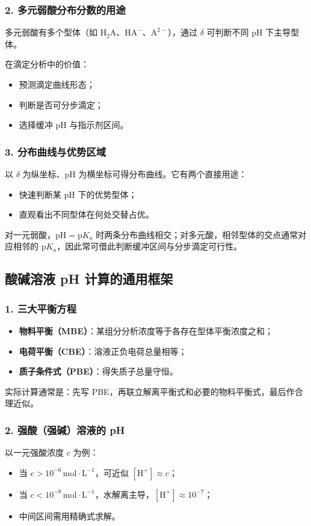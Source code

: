 \documentclass[12pt,a4paper]{article}
\numberwithin{equation}{section}
\begin{document}
\subsubsection{2. 多元弱酸分布分数的用途}
多元弱酸有多个型体（如 $\mathrm{H_2A}$、$\mathrm{HA^-}$、$\mathrm{A^{2-}}$），通过 $\delta$ 可判断不同 pH 下主导型体。

在滴定分析中的价值：
\begin{itemize}
    \item 预测滴定曲线形态；
    \item 判断是否可分步滴定；
    \item 选择缓冲 pH 与指示剂区间。
\end{itemize}

\subsubsection{3. 分布曲线与优势区域}
以 $\delta$ 为纵坐标、pH 为横坐标可得分布曲线。它有两个直接用途：
\begin{itemize}
    \item 快速判断某 pH 下的优势型体；
    \item 直观看出不同型体在何处交替占优。
\end{itemize}

对一元弱酸，$\mathrm{pH}=\mathrm{p}K_a$ 时两条分布曲线相交；对多元酸，相邻型体的交点通常对应相邻的
$\mathrm{p}K_a$，因此常可借此判断缓冲区间与分步滴定可行性。

\subsection{酸碱溶液 pH 计算的通用框架}

\subsubsection{1. 三大平衡方程}
\begin{itemize}
    \item \textbf{物料平衡（MBE）}：某组分分析浓度等于各存在型体平衡浓度之和；
    \item \textbf{电荷平衡（CBE）}：溶液正负电荷总量相等；
    \item \textbf{质子条件式（PBE）}：得失质子总量守恒。
\end{itemize}

实际计算通常是：先写 PBE，再联立解离平衡式和必要的物料平衡式，最后作合理近似。

\subsubsection{2. 强酸（强碱）溶液的 pH}
以一元强酸浓度 $c$ 为例：
\begin{itemize}
    \item 当 $c>10^{-6}\,\mathrm{mol\cdot L^{-1}}$，可近似 $[\mathrm{H^+}]\approx c$；
    \item 当 $c<10^{-8}\,\mathrm{mol\cdot L^{-1}}$，水解离主导，$[\mathrm{H^+}]\approx 10^{-7}$；
    \item 中间区间需用精确式求解。
\end{itemize}
\end{document}
